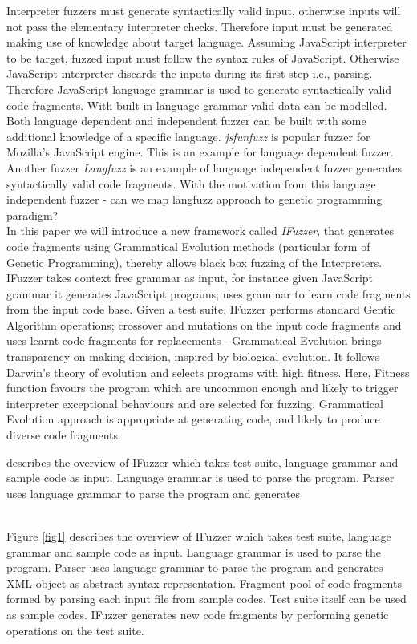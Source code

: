 \documentclass{sig-alternate}
\begin{document}
\indent Interpreter fuzzers must generate syntactically valid input, otherwise inputs will not pass the elementary interpreter checks. Therefore input must be generated making use of knowledge about target language. Assuming JavaScript interpreter to be target, fuzzed input must follow the syntax rules of JavaScript. Otherwise JavaScript interpreter discards the inputs during its first step i.e., parsing. Therefore JavaScript language grammar is used to generate syntactically valid code fragments. With built-in language grammar valid data can be modelled. Both language dependent and independent fuzzer can be built with some additional knowledge of a specific language. \textit{jsfunfuzz} is popular fuzzer for Mozilla's JavaScript engine. This is an example for language dependent fuzzer. Another fuzzer \textit{Langfuzz} is an example of language independent fuzzer generates syntactically valid code fragments. With the motivation from this language independent fuzzer - can we map langfuzz approach to genetic programming paradigm?\\
\indent In this paper we will introduce a new framework called \textit{IFuzzer}, that generates code fragments using Grammatical Evolution methods (particular form of Genetic Programming), thereby allows black box fuzzing of the Interpreters. IFuzzer takes context free grammar as input, for instance given JavaScript grammar it generates JavaScript programs; uses grammar to learn code fragments from the input code base. Given a test suite, IFuzzer performs standard Gentic Algorithm  operations; crossover and mutations on the input code fragments and uses learnt code fragments for replacements - Grammatical Evolution brings transparency on making decision, inspired by biological evolution. It follows Darwin's theory of evolution and selects programs with high fitness. Here, Fitness function favours  the program which are uncommon enough and likely to trigger interpreter exceptional behaviours and are selected for fuzzing. Grammatical Evolution approach is appropriate at generating code, and likely to produce diverse code fragments.
\begin{figure*}
\centering
{}
\caption {Overview of IFuzzer Approach}
\medskip
 describes the overview of IFuzzer which takes test suite, language grammar and sample code as input. Language grammar is used to parse the program. Parser uses language grammar to parse the program and generates 
\label{fig1}
\end{figure*}
\\\indent  Figure \ref{fig1} describes the overview of IFuzzer which takes test suite, language grammar and sample code as input. Language grammar is used to parse the program. Parser uses language grammar to parse the program and generates XML object as abstract syntax representation. Fragment pool of code fragments formed by parsing each input file from sample codes. Test suite itself can be used as sample codes. IFuzzer generates new code fragments by performing genetic operations on the test suite. 
\end{document}
